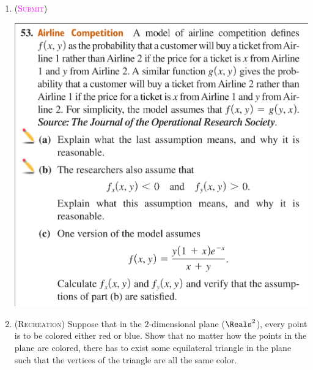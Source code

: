 \begin{enumerate}
        \newpage

    \item 
        (\textsc{\textcolor{magenta}{Submit}})
        \begin{center}
            \includegraphics[width=.83\textwidth]{screenshots/53.png}
        \end{center}

    \item 
        (\textsc{Recreation})
        Suppose that in the $2$-dimensional plane ($\Reals^2$),
        every point is to be colored either red or blue.
        Show that no matter how the points in the plane are colored,
        there has to exist some equilateral triangle in the plane 
        such that the vertices of the triangle are all the same color.

\end{enumerate}



